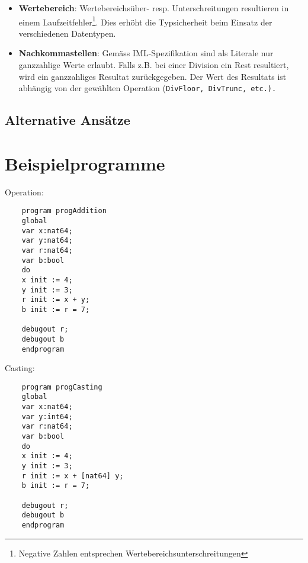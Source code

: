 \documentclass[10pt, a4paper, twocolumn]{article} %
\begin{document}
\begin{itemize}
    \item \textbf{Wertebereich}: Wertebereichsüber- resp. Unterschreitungen resultieren in einem Laufzeitfehler\footnote{Negative Zahlen entsprechen Wertebereichsunterschreitungen}. Dies erhöht die Typsicherheit beim Einsatz der verschiedenen Datentypen.
    \item \textbf{Nachkommastellen}: Gemäss IML-Spezifikation sind als Literale nur ganzzahlige Werte erlaubt. Falls z.B. bei einer Division ein Rest resultiert, wird ein ganzzahliges Resultat zurückgegeben. Der Wert des Resultats ist abhängig von der gewählten Operation (\texttt{DivFloor, \texttt{DivTrunc}, etc.).}
\end{itemize}

\subsection{Alternative Ansätze}

\section{Beispielprogramme}
\label{sec:prog}
Operation:
\begin{lstlisting}
    program progAddition
    global
    var x:nat64;
    var y:nat64;
    var r:nat64;
    var b:bool
    do
    x init := 4;
    y init := 3;
    r init := x + y;
    b init := r = 7;

    debugout r;
    debugout b
    endprogram
\end{lstlisting}
Casting:
\begin{lstlisting}
    program progCasting
    global
    var x:nat64;
    var y:int64;
    var r:nat64;
    var b:bool
    do
    x init := 4;
    y init := 3;
    r init := x + [nat64] y;
    b init := r = 7;

    debugout r;
    debugout b
    endprogram
\end{lstlisting}

\end{document}
